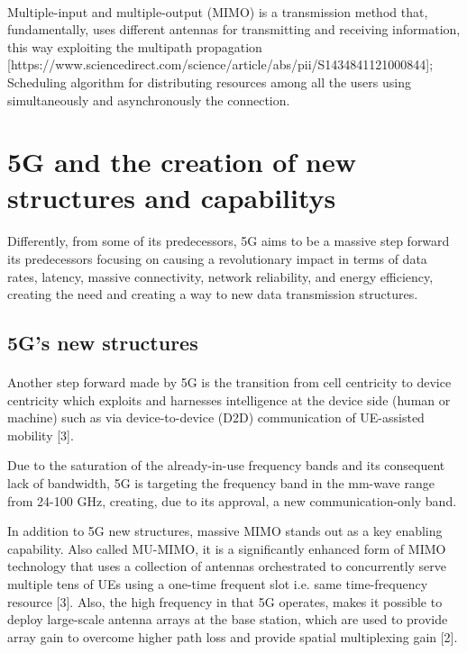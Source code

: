 \documentclass[10pt,journal,compsoc]{IEEEtran}
\begin{document}
\paragraph{}
Multiple-input and multiple-output (MIMO) is a transmission method that, fundamentally, uses different antennas for transmitting and receiving information, this way exploiting the multipath propagation [https://www.sciencedirect.com/science/article/abs/pii/S1434841121000844]; Scheduling algorithm for distributing resources among all the users using simultaneously and asynchronously the connection.


\section{5G and the creation of new structures and capabilitys}
\paragraph{}
Differently, from some of its predecessors, 5G aims to be a massive step forward its predecessors focusing on causing a revolutionary impact in terms of data rates, latency, massive connectivity, network reliability, and energy efficiency, creating the need and creating a way to new data transmission structures.\par
\subsection*{5G's new structures}
\paragraph{}
Another step forward made by 5G is the transition from cell centricity to device centricity which exploits and harnesses intelligence at the device side (human or machine) such as via device-to-device (D2D) communication of UE-assisted mobility [3].\par
Due to the saturation of the already-in-use frequency bands and its consequent lack of bandwidth, 5G is targeting the frequency band in the mm-wave range from 24-100 GHz, creating, due to its approval, a new communication-only band.\par
In addition to 5G new structures, massive MIMO stands out as a key enabling capability. Also called MU-MIMO, it is a significantly enhanced form of MIMO technology that uses a collection of antennas orchestrated to concurrently serve multiple tens of UEs using a one-time frequent slot i.e. same time-frequency resource [3]. Also, the high frequency in that 5G operates, makes it possible to deploy large-scale antenna arrays at the base station, which are used to provide array gain to overcome higher path loss and provide spatial multiplexing gain [2].\par
\end{document}
